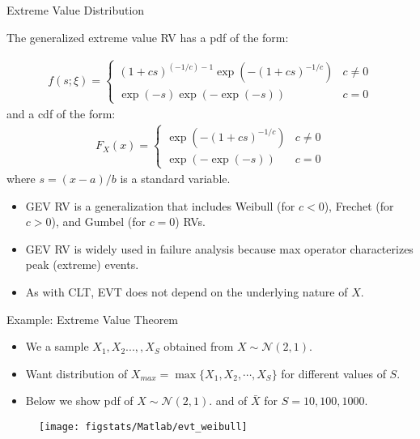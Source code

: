 \documentclass[9pt]{beamer}
\begin{document}
%
\begin{frame}{Extreme Value Distribution}

The generalized extreme value RV has a pdf of the form:
\begin{block}{}
\begin{align*}
f(s;\xi) = \begin{cases}(1+c s)^{(-1/c)-1} \exp(-(1+c s)^{-1/c}) & c\neq0 \\
\exp(-s) \exp(-\exp(-s)) & c = 0\end{cases}
\end{align*}
and a cdf of the form:
\begin{align*}
F_X(x)= \begin{cases}\exp(-(1+c s)^{-1/c}) & c\neq0 \\ \exp(-\exp(-s)) & c = 0\end{cases}
\end{align*}
where $s=(x-a)/b$ is a standard variable. 
\end{block}
\begin{itemize}
\item GEV RV is a generalization that includes Weibull (for $c<0$), Frechet (for $c>0$), and Gumbel (for $c=0$) RVs. 


\item GEV RV is widely used in failure analysis because max operator characterizes peak (extreme) events. 

\item As with CLT,  EVT does not depend on the underlying nature of $X$. 

\end{itemize}


\end{frame}

%
\begin{frame}{Example: Extreme Value Theorem}

\begin{itemize}
\item We a sample $X_1,X_2...,,X_S$ obtained from $X\sim \mathcal{N}(2,1)$.
\item Want distribution of $X_{max}=\max\{X_1,X_2,\cdots, X_S\}$ for different values of $S$.
\item Below we show pdf of $X\sim \mathcal{N}(2,1)$. and of $\bar{X}$ for $S=10,100,1000$.
\end{itemize}
\begin{figure}[!htb]
    \centering
	\texttt{[image: figstats/Matlab/evt\_weibull]}
\end{figure}

\end{frame}
\end{document}
